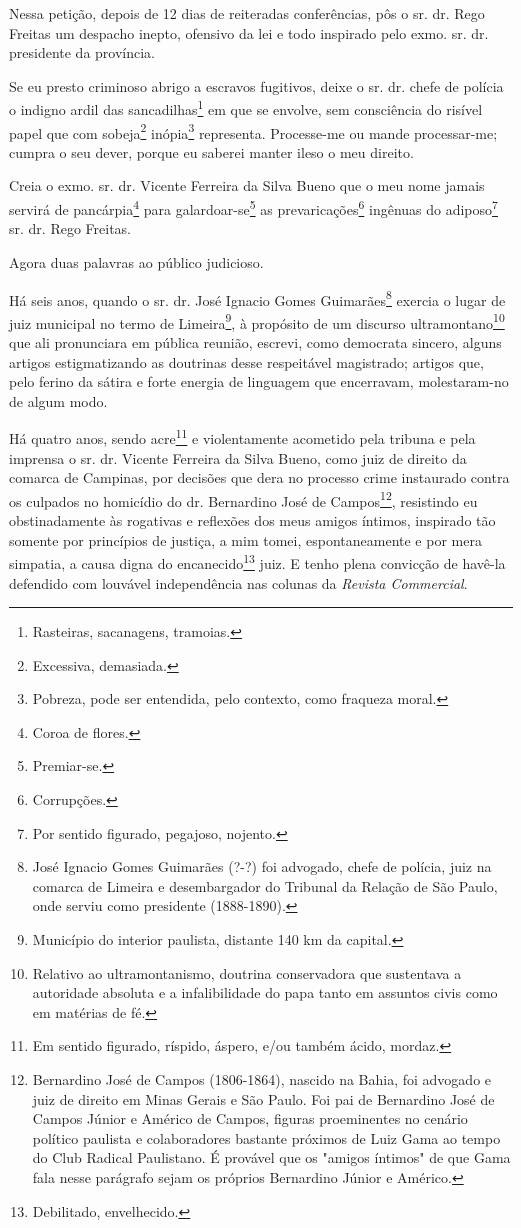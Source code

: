 Nessa petição, depois de 12 dias de reiteradas conferências, pôs o sr.
dr. Rego Freitas um despacho inepto, ofensivo da lei e todo inspirado
pelo exmo. sr. dr. presidente da província.

Se eu presto criminoso abrigo a escravos fugitivos, deixe o sr. dr.
chefe de polícia o indigno ardil das sancadilhas\footnote{Rasteiras,
  sacanagens, tramoias.} em que se envolve, sem consciência do risível
papel que com sobeja\footnote{Excessiva, demasiada.} inópia\footnote{
  Pobreza, pode ser entendida, pelo contexto, como fraqueza moral.}
representa. Processe-me ou mande processar-me; cumpra o seu dever,
porque eu saberei manter ileso o meu direito.

Creia o exmo. sr. dr. Vicente Ferreira da Silva Bueno que o meu nome
jamais servirá de pancárpia\footnote{Coroa de flores.} para
galardoar-se\footnote{Premiar-se.} as prevaricações\footnote{
  Corrupções.} ingênuas do adiposo\footnote{Por sentido figurado,
  pegajoso, nojento.} sr. dr. Rego Freitas.

Agora duas palavras ao público judicioso.

Há seis anos, quando o sr. dr. José Ignacio Gomes Guimarães\footnote{
  José Ignacio Gomes Guimarães (?-?) foi advogado, chefe de polícia,
  juiz na comarca de Limeira e desembargador do Tribunal da Relação de
  São Paulo, onde serviu como presidente (1888-1890).} exercia o lugar
de juiz municipal no termo de Limeira\footnote{Município do interior
  paulista, distante 140 km da capital.}, à propósito de um discurso
ultramontano\footnote{Relativo ao ultramontanismo, doutrina
  conservadora que sustentava a autoridade absoluta e a infalibilidade
  do papa tanto em assuntos civis como em matérias de fé.} que ali
pronunciara em pública reunião, escrevi, como democrata sincero, alguns
artigos estigmatizando as doutrinas desse respeitável magistrado;
artigos que, pelo ferino da sátira e forte energia de linguagem que
encerravam, molestaram-no de algum modo.

Há quatro anos, sendo acre\footnote{Em sentido figurado, ríspido,
  áspero, e/ou também ácido, mordaz.} e violentamente acometido pela
tribuna e pela imprensa o sr. dr. Vicente Ferreira da Silva Bueno, como
juiz de direito da comarca de Campinas, por decisões que dera no
processo crime instaurado contra os culpados no homicídio do dr.
Bernardino José de Campos\footnote{Bernardino José de Campos
  (1806-1864), nascido na Bahia, foi advogado e juiz de direito em Minas
  Gerais e São Paulo. Foi pai de Bernardino José de Campos Júnior e
  Américo de Campos, figuras proeminentes no cenário político paulista e
  colaboradores bastante próximos de Luiz Gama ao tempo do Club Radical
  Paulistano. É provável que os "amigos íntimos" de que Gama fala nesse
  parágrafo sejam os próprios Bernardino Júnior e Américo.}, resistindo
eu obstinadamente às rogativas e reflexões dos meus amigos íntimos,
inspirado tão somente por princípios de justiça, a mim tomei,
espontaneamente e por mera simpatia, a causa digna do
encanecido\footnote{Debilitado, envelhecido.} juiz. E tenho plena
convicção de havê-la defendido com louvável independência nas colunas da
\emph{Revista Commercial}.

